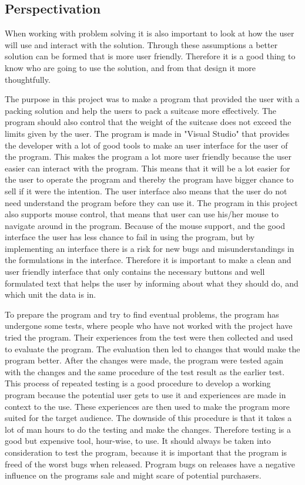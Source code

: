 \subsection{Perspectivation}
When working with problem solving it is also important to look at how the user will use and interact with the solution. Through these assumptions a better solution can be formed that is more user friendly. Therefore it is a good thing to know who are going to use the solution, and from that design it more thoughtfully.

The purpose in this project was to make a program that provided the user with a packing solution and help the users to pack a suitcase more effectively. The program should also control that the weight of the suitcase does not exceed the limits given by the user. The program is made in "Visual Studio" that provides the developer with a lot of good tools to make an user interface for the user of the program.
This makes the program a lot more user friendly because the user easier can interact with the program. This means that it will be a lot easier for the user to operate the program and thereby the program have bigger chance to sell if it were the intention.
The user interface also means that the user do not need understand the program before they can use it.
The program in this project also supports mouse control, that means that user can use his/her mouse to navigate around in the program. Because of the mouse support, and the good interface the user has less chance to fail in using the program, but by implementing an interface there is a risk for new bugs and misunderstandings in the formulations in the interface.
Therefore it is important to make a clean and user friendly interface that only contains the necessary buttons and well formulated text that helps the user by informing about what they should do, and which unit the data is in.

To prepare the program and try to find eventual problems, the program has undergone some tests, where people who have not worked with the project have tried the program. Their experiences from the test were then collected and used to evaluate the program. The evaluation then led to changes that would make the program better. After the changes were made, the program were tested again with the changes and the same procedure of the test result as the earlier test.
This process of repeated testing is a good procedure to develop a working program because the potential user gets to use it and experiences are made in context to the use. These experiences are then used to make the program more suited for the target audience. The downside of this procedure is that it takes a lot of man hours to do the testing and make the changes. Therefore testing is a good but expensive tool, hour-wise, to use.
It should always be taken into consideration to test the program, because it is important that the program is freed of the worst bugs when released. Program bugs on releases have a negative influence on the programs sale and might scare of potential purchasers.

